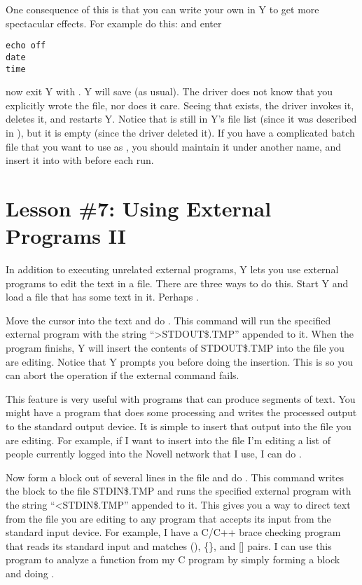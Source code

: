 One consequence of this is that you can write your own  in Y to get more
spectacular effects. For example do this:  and enter

\begin{verbatim}
echo off
date
time
\end{verbatim}

now exit Y with . Y will save  (as usual). The driver does
not know that you explicitly wrote the file, nor does it care. Seeing that
 exists, the driver invokes it, deletes it, and restarts Y. Notice that
 is still in Y's file list (since it was described in
), but it is empty (since the driver deleted it). If you have a
complicated batch file that you want to use as , you should maintain it
under another name, and insert it into  with  before each run.

\section{Lesson \#7: Using External Programs II}

In addition to executing unrelated external programs, Y lets you use external programs to edit
the text in a file. There are three ways to do this. Start Y and load a file that has some text
in it. Perhaps .

Move the cursor into the text and do . This command will run the specified
external program with the string ``>STDOUT\$.TMP'' appended to it. When the program finishs, Y
will insert the contents of STDOUT\$.TMP into the file you are editing. Notice that Y prompts
you before doing the insertion. This is so you can abort the operation if the external command
fails.

This feature is very useful with programs that can produce segments of text. You might have a
program that does some processing and writes the processed output to the standard output device.
It is simple to insert that output into the file you are editing. For example, if I want to
insert into the file I'm editing a list of people currently logged into the Novell network that
I use, I can do .

Now form a block out of several lines in the file and do . This command
writes the block to the file STDIN\$.TMP and runs the specified external program with the string
``<STDIN\$.TMP'' appended to it. This gives you a way to direct text from the file you are
editing to any program that accepts its input from the standard input device. For example, I
have a C/C++ brace checking program that reads its standard input and matches (), \{\}, and []
pairs. I can use this program to analyze a function from my C program by simply forming a block
and doing .

